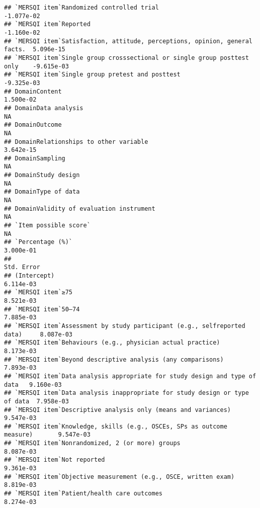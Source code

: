\documentclass[]{article}
\begin{document}
\begin{verbatim}
## `MERSQI item`Randomized controlled trial                                  -1.077e-02
## `MERSQI item`Reported                                                     -1.160e-02
## `MERSQI item`Satisfaction, attitude, perceptions, opinion, general facts.  5.096e-15
## `MERSQI item`Single group crosssectional or single group posttest only    -9.615e-03
## `MERSQI item`Single group pretest and posttest                            -9.325e-03
## DomainContent                                                              1.500e-02
## DomainData analysis                                                               NA
## DomainOutcome                                                                     NA
## DomainRelationships to other variable                                      3.642e-15
## DomainSampling                                                                    NA
## DomainStudy design                                                                NA
## DomainType of data                                                                NA
## DomainValidity of evaluation instrument                                           NA
## `Item possible score`                                                             NA
## `Percentage (%)`                                                           3.000e-01
##                                                                           Std. Error
## (Intercept)                                                                6.114e-03
## `MERSQI item`≥75                                                           8.521e-03
## `MERSQI item`50–74                                                         7.885e-03
## `MERSQI item`Assessment by study participant (e.g., selfreported data)     8.087e-03
## `MERSQI item`Behaviours (e.g., physician actual practice)                  8.173e-03
## `MERSQI item`Beyond descriptive analysis (any comparisons)                 7.893e-03
## `MERSQI item`Data analysis appropriate for study design and type of data   9.160e-03
## `MERSQI item`Data analysis inappropriate for study design or type of data  7.958e-03
## `MERSQI item`Descriptive analysis only (means and variances)               9.547e-03
## `MERSQI item`Knowledge, skills (e.g., OSCEs, SPs as outcome measure)       9.547e-03
## `MERSQI item`Nonrandomized, 2 (or more) groups                             8.087e-03
## `MERSQI item`Not reported                                                  9.361e-03
## `MERSQI item`Objective measurement (e.g., OSCE, written exam)              8.819e-03
## `MERSQI item`Patient/health care outcomes                                  8.274e-03

\end{verbatim}
\end{document}
